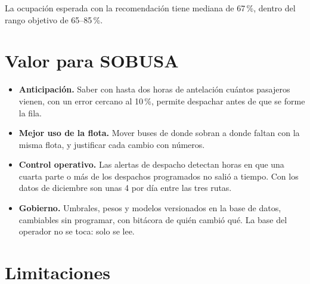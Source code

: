 \documentclass[11pt,a4paper]{article}
\begin{document}
La ocupación esperada con la recomendación tiene mediana de 67\,\%, dentro del rango objetivo de 65--85\,\%.

\section*{Valor para SOBUSA}

\begin{itemize}
  \setlength{\itemsep}{0.15em}
  \item \textbf{Anticipación.} Saber con hasta dos horas de antelación cuántos pasajeros vienen, con un error cercano al 10\,\%, permite despachar antes de que se forme la fila.
  \item \textbf{Mejor uso de la flota.} Mover buses de donde sobran a donde faltan con la misma flota, y justificar cada cambio con números.
  \item \textbf{Control operativo.} Las alertas de despacho detectan horas en que una cuarta parte o más de los despachos programados no salió a tiempo. Con los datos de diciembre son unas 4 por día entre las tres rutas.
  \item \textbf{Gobierno.} Umbrales, pesos y modelos versionados en la base de datos, cambiables sin programar, con bitácora de quién cambió qué. La base del operador no se toca: solo se lee.
\end{itemize}

\section*{Limitaciones}
\end{document}
